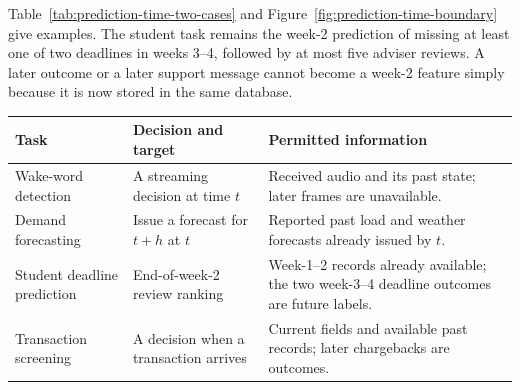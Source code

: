 Table~\ref{tab:prediction-time-two-cases} and Figure~\ref{fig:prediction-time-boundary} give examples. The student task remains the week-2 prediction of missing at least one of two deadlines in weeks 3--4, followed by at most five adviser reviews. A later outcome or a later support message cannot become a week-2 feature simply because it is now stored in the same database.

\par\addvspace{\intextsep}\noindent\begin{minipage}{\linewidth}
\centering
\setlength{\tabcolsep}{3pt}
\renewcommand{\arraystretch}{1.12}
\begin{tabular}{@{}>{\raggedright\arraybackslash}p{2.3cm}>{\raggedright\arraybackslash}p{3.3cm}>{\raggedright\arraybackslash}p{4.4cm}@{}}
\toprule
Task & Decision and target & Permitted information \\
\midrule
Wake-word detection & A streaming decision at time $t$ & Received audio and its past state; later frames are unavailable. \\
Demand forecasting & Issue a forecast for $t+h$ at $t$ & Reported past load and weather forecasts already issued by $t$. \\
Student deadline prediction & End-of-week-2 review ranking & Week-1--2 records already available; the two week-3--4 deadline outcomes are future labels. \\
Transaction screening & A decision when a transaction arrives & Current fields and available past records; later chargebacks are outcomes. \\
\bottomrule
\end{tabular}
\label{tab:prediction-time-two-cases}\label{tab:prediction-time-breadth}
\end{minipage}\par\addvspace{\intextsep}

